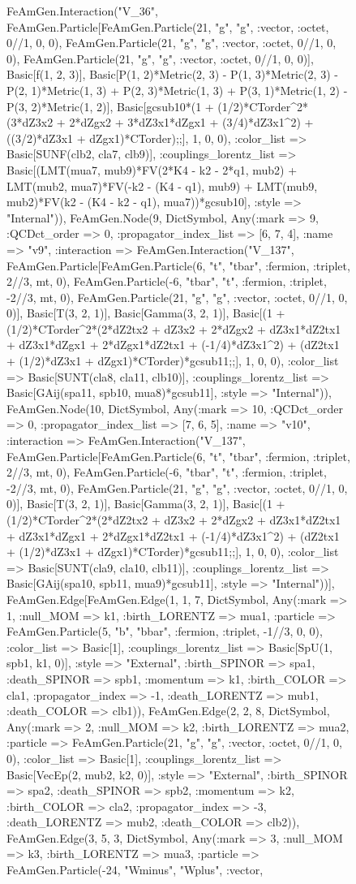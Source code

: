 \documentclass{revtex4}
\begin{document}
\begin{figure}[!htb]
\begin{center}
{FeAmGen.Interaction("V_36", FeAmGen.Particle[FeAmGen.Particle(21, "g", "g", :vector, :octet, 0//1, 0, 0), FeAmGen.Particle(21, "g", "g", :vector, :octet, 0//1, 0, 0), FeAmGen.Particle(21, "g", "g", :vector, :octet, 0//1, 0, 0)], Basic[f(1, 2, 3)], Basic[P(1, 2)*Metric(2, 3) - P(1, 3)*Metric(2, 3) - P(2, 1)*Metric(1, 3) + P(2, 3)*Metric(1, 3) + P(3, 1)*Metric(1, 2) - P(3, 2)*Metric(1, 2)], Basic[gcsub10*(1 + (1/2)*CTorder^2*(3*dZ3x2 + 2*dZgx2 + 3*dZ3x1*dZgx1 + (3/4)*dZ3x1^2) + ((3/2)*dZ3x1 + dZgx1)*CTorder);;], 1, 0, 0), :color_list => Basic[SUNF(clb2, cla7, clb9)], :couplings_lorentz_list => Basic[(LMT(mua7, mub9)*FV(2*K4 - k2 - 2*q1, mub2) + LMT(mub2, mua7)*FV(-k2 - (K4 - q1), mub9) + LMT(mub9, mub2)*FV(k2 - (K4 - k2 - q1), mua7))*gcsub10], :style => "Internal")), FeAmGen.Node(9, Dict{Symbol, Any}(:mark => 9, :QCDct_order => 0, :propagator_index_list => [6, 7, 4], :name => "v9", :interaction => FeAmGen.Interaction("V_137", FeAmGen.Particle[FeAmGen.Particle(6, "t", "tbar", :fermion, :triplet, 2//3, mt, 0), FeAmGen.Particle(-6, "tbar", "t", :fermion, :triplet, -2//3, mt, 0), FeAmGen.Particle(21, "g", "g", :vector, :octet, 0//1, 0, 0)], Basic[T(3, 2, 1)], Basic[Gamma(3, 2, 1)], Basic[(1 + (1/2)*CTorder^2*(2*dZ2tx2 + dZ3x2 + 2*dZgx2 + dZ3x1*dZ2tx1 + dZ3x1*dZgx1 + 2*dZgx1*dZ2tx1 + (-1/4)*dZ3x1^2) + (dZ2tx1 + (1/2)*dZ3x1 + dZgx1)*CTorder)*gcsub11;;], 1, 0, 0), :color_list => Basic[SUNT(cla8, cla11, clb10)], :couplings_lorentz_list => Basic[GAij(spa11, spb10, mua8)*gcsub11], :style => "Internal")), FeAmGen.Node(10, Dict{Symbol, Any}(:mark => 10, :QCDct_order => 0, :propagator_index_list => [7, 6, 5], :name => "v10", :interaction => FeAmGen.Interaction("V_137", FeAmGen.Particle[FeAmGen.Particle(6, "t", "tbar", :fermion, :triplet, 2//3, mt, 0), FeAmGen.Particle(-6, "tbar", "t", :fermion, :triplet, -2//3, mt, 0), FeAmGen.Particle(21, "g", "g", :vector, :octet, 0//1, 0, 0)], Basic[T(3, 2, 1)], Basic[Gamma(3, 2, 1)], Basic[(1 + (1/2)*CTorder^2*(2*dZ2tx2 + dZ3x2 + 2*dZgx2 + dZ3x1*dZ2tx1 + dZ3x1*dZgx1 + 2*dZgx1*dZ2tx1 + (-1/4)*dZ3x1^2) + (dZ2tx1 + (1/2)*dZ3x1 + dZgx1)*CTorder)*gcsub11;;], 1, 0, 0), :color_list => Basic[SUNT(cla9, cla10, clb11)], :couplings_lorentz_list => Basic[GAij(spa10, spb11, mua9)*gcsub11], :style => "Internal"))], FeAmGen.Edge[FeAmGen.Edge(1, 1, 7, Dict{Symbol, Any}(:mark => 1, :null_MOM => k1, :birth_LORENTZ => mua1, :particle => FeAmGen.Particle(5, "b", "bbar", :fermion, :triplet, -1//3, 0, 0), :color_list => Basic[1], :couplings_lorentz_list => Basic[SpU(1, spb1, k1, 0)], :style => "External", :birth_SPINOR => spa1, :death_SPINOR => spb1, :momentum => k1, :birth_COLOR => cla1, :propagator_index => -1, :death_LORENTZ => mub1, :death_COLOR => clb1)), FeAmGen.Edge(2, 2, 8, Dict{Symbol, Any}(:mark => 2, :null_MOM => k2, :birth_LORENTZ => mua2, :particle => FeAmGen.Particle(21, "g", "g", :vector, :octet, 0//1, 0, 0), :color_list => Basic[1], :couplings_lorentz_list => Basic[VecEp(2, mub2, k2, 0)], :style => "External", :birth_SPINOR => spa2, :death_SPINOR => spb2, :momentum => k2, :birth_COLOR => cla2, :propagator_index => -3, :death_LORENTZ => mub2, :death_COLOR => clb2)), FeAmGen.Edge(3, 5, 3, Dict{Symbol, Any}(:mark => 3, :null_MOM => k3, :birth_LORENTZ => mua3, :particle => FeAmGen.Particle(-24, "Wminus", "Wplus", :vector, }
\end{center}
\end{figure}
\end{document}
